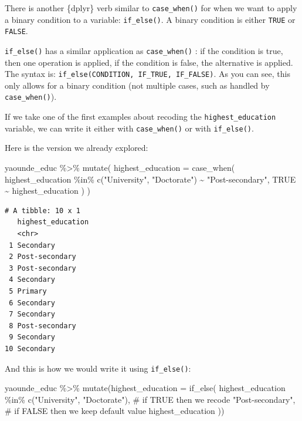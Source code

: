 \documentclass[
  letterpaper,
  DIV=11,
  numbers=noendperiod]{scrreprt}
\newenvironment{Shaded}{\begin{snugshade}}{\end{snugshade}}
\newcommand{\AttributeTok}[1]{\textcolor[rgb]{0.40,0.45,0.13}{#1}}
\newcommand{\CommentTok}[1]{\textcolor[rgb]{0.37,0.37,0.37}{#1}}
\newcommand{\ConstantTok}[1]{\textcolor[rgb]{0.56,0.35,0.01}{#1}}
\newcommand{\FunctionTok}[1]{\textcolor[rgb]{0.28,0.35,0.67}{#1}}
\newcommand{\NormalTok}[1]{\textcolor[rgb]{0.00,0.23,0.31}{#1}}
\newcommand{\SpecialCharTok}[1]{\textcolor[rgb]{0.37,0.37,0.37}{#1}}
\newcommand{\StringTok}[1]{\textcolor[rgb]{0.13,0.47,0.30}{#1}}
\begin{document}
There is another \{dplyr\} verb similar to \texttt{case\_when()} for
when we want to apply a binary condition to a variable:
\texttt{if\_else()}. A binary condition is either \texttt{TRUE} or
\texttt{FALSE}.

\texttt{if\_else()} has a similar application as \texttt{case\_when()} :
if the condition is true, then one operation is applied, if the
condition is false, the alternative is applied. The syntax is:
\texttt{if\_else(CONDITION,\ IF\_TRUE,\ IF\_FALSE)}. As you can see,
this only allows for a binary condition (not multiple cases, such as
handled by \texttt{case\_when()}).

If we take one of the first examples about recoding the
\texttt{highest\_education} variable, we can write it either with
\texttt{case\_when()} or with \texttt{if\_else()}.

Here is the version we already explored:

\begin{Shaded}
\begin{Highlighting}[]
\NormalTok{yaounde\_educ }\SpecialCharTok{\%\textgreater{}\%}
  \FunctionTok{mutate}\NormalTok{(}
    \AttributeTok{highest\_education =}
      \FunctionTok{case\_when}\NormalTok{(}
\NormalTok{        highest\_education }\SpecialCharTok{\%in\%} \FunctionTok{c}\NormalTok{(}\StringTok{"University"}\NormalTok{, }\StringTok{"Doctorate"}\NormalTok{) }\SpecialCharTok{\textasciitilde{}} \StringTok{"Post{-}secondary"}\NormalTok{,}
        \ConstantTok{TRUE} \SpecialCharTok{\textasciitilde{}}\NormalTok{ highest\_education}
\NormalTok{      )}
\NormalTok{  )}
\end{Highlighting}
\end{Shaded}

\begin{verbatim}
# A tibble: 10 x 1
   highest_education
   <chr>            
 1 Secondary        
 2 Post-secondary   
 3 Post-secondary   
 4 Secondary        
 5 Primary          
 6 Secondary        
 7 Secondary        
 8 Post-secondary   
 9 Secondary        
10 Secondary        
\end{verbatim}

And this is how we would write it using \texttt{if\_else()}:

\begin{Shaded}
\begin{Highlighting}[]
\NormalTok{yaounde\_educ }\SpecialCharTok{\%\textgreater{}\%}
  \FunctionTok{mutate}\NormalTok{(}\AttributeTok{highest\_education =} 
           \FunctionTok{if\_else}\NormalTok{(}
\NormalTok{             highest\_education }\SpecialCharTok{\%in\%} \FunctionTok{c}\NormalTok{(}\StringTok{"University"}\NormalTok{, }\StringTok{"Doctorate"}\NormalTok{),}
             \CommentTok{\# if TRUE then we recode}
             \StringTok{"Post{-}secondary"}\NormalTok{,}
             \CommentTok{\# if FALSE then we keep default value}
\NormalTok{             highest\_education}
\NormalTok{             ))}
\end{Highlighting}
\end{Shaded}
\end{document}
